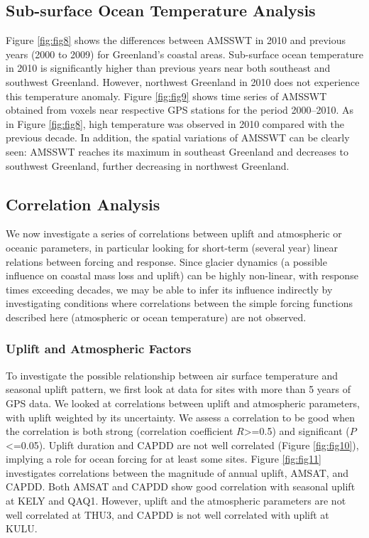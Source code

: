 \subsection{Sub-surface Ocean Temperature Analysis}
Figure \ref{fig:fig8} shows the differences between
AMSSWT in 2010 and previous years (2000 to
2009) for Greenland’s coastal areas. Sub-surface
ocean temperature in 2010 is significantly higher than
previous years near both southeast and southwest
Greenland. However, northwest Greenland in 2010
does not experience this temperature anomaly.
Figure \ref{fig:fig9} shows time series of AMSSWT obtained
from voxels near respective GPS stations for the
period 2000–2010. As in Figure \ref{fig:fig8}, high temperature
was observed in 2010 compared with the previous
decade. In addition, the spatial variations of AMSSWT
can be clearly seen: AMSSWT reaches its maximum
in southeast Greenland and decreases to southwest
Greenland, further decreasing in northwest Greenland.

\subsection{Correlation Analysis}
We now investigate a series of correlations
between uplift and atmospheric or oceanic parameters,
in particular looking for short-term (several year)
linear relations between forcing and response. Since
glacier dynamics (a possible influence on coastal
mass loss and uplift) can be highly non-linear, with
response times exceeding decades, we may be able
to infer its influence indirectly by investigating
conditions where correlations between the simple
forcing functions described here (atmospheric or
ocean temperature) are not observed.

\subsubsection{Uplift and Atmospheric Factors}
To investigate the possible relationship between
air surface temperature and seasonal uplift pattern,
we first look at data for sites with more than 5 years
of GPS data. We looked at correlations between
uplift and atmospheric parameters, with uplift
weighted by its uncertainty. We assess a correlation
to be good when the correlation is both strong
(correlation coefficient $R$>=0.5) and significant
($P$<=0.05). Uplift duration and CAPDD are not
well correlated (Figure \ref{fig:fig10}), implying a role for ocean
forcing for at least some sites. Figure \ref{fig:fig11} investigates
correlations between the magnitude of annual
uplift, AMSAT, and CAPDD. Both AMSAT and
CAPDD show good correlation with seasonal uplift
at KELY and QAQ1. However, uplift and the
atmospheric parameters are not well correlated at
THU3, and CAPDD is not well correlated with uplift
at KULU.

